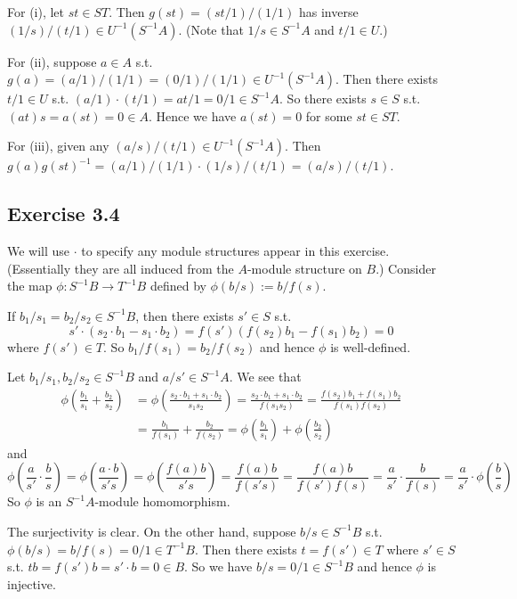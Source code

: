 \documentclass[../A&M.tex]{subfiles}
\begin{document}
For (i), let $st \in ST$. Then $g(st) = (st/1)/(1/1)$ has inverse $(1/s)/(t/1) \in U^{-1}(S^{-1}A)$. (Note that $1/s \in S^{-1}A$ and $t/1 \in U$.)

For (ii), suppose $a\in A$ s.t. $g(a)=(a/1)/(1/1) = (0/1)/(1/1) \in U^{-1}(S^{-1}A)$. Then there exists $t/1 \in U$ s.t. $(a/1) \cdot (t/1) = at/1 = 0/1 \in S^{-1}A$. So there exists $s\in S$ s.t. $(at)s = a(st) = 0 \in A$. Hence we have $a(st)=0$ for some $st \in ST$.

For (iii), given any $(a/s)/(t/1) \in U^{-1}(S^{-1}A)$. Then $g(a)g(st)^{-1} = (a/1)/(1/1) \cdot (1/s)/(t/1) = (a/s)/(t/1)$.

\subsection*{Exercise 3.4}

We will use $\cdot$ to specify any module structures appear in this exercise. (Essentially they are all induced from the $A$-module structure on $B$.) Consider the map $\phi: S^{-1}B \to T^{-1}B$ defined by $\phi(b/s) := b/f(s)$.

If $b_1/s_1 = b_2/s_2 \in S^{-1}B$, then there exists $s' \in S$ s.t.
$$
s' \cdot (s_2\cdot b_1 - s_1 \cdot b_2)
= f(s')(f(s_2)b_1-f(s_1)b_2)
= 0 
$$
where $f(s')\in T$. So $b_1/f(s_1) = b_2/f(s_2)$ and hence $\phi$ is well-defined.

Let $b_1/s_1, b_2/s_2 \in S^{-1}B$ and $a/s' \in S^{-1}A$. We see that
\begin{align*}
\phi \left( \frac{b_1}{s_1} + \frac{b_2}{s_2} \right)
&= \phi \left( \frac{s_2 \cdot b_1 + s_1 \cdot b_2}{s_1s_2} \right)
= \frac{s_2 \cdot b_1 + s_1 \cdot b_2}{f(s_1s_2)}
= \frac{f(s_2)b_1 + f(s_1)b_2}{f(s_1)f(s_2)}     \\
&= \frac{b_1}{f(s_1)} + \frac{b_2}{f(s_2)}
= \phi \left( \frac{b_1}{s_1} \right) + \phi \left( \frac{b_2}{s_2} \right)
\end{align*}
and
$$
\phi \left( \frac{a}{s'} \cdot \frac{b}{s} \right)
= \phi \left( \frac{a \cdot b}{s's} \right)
= \phi \left( \frac{f(a)b}{s's} \right)
= \frac{f(a)b}{f(s's)}
= \frac{f(a)b}{f(s')f(s)}
= \frac{a}{s'} \cdot \frac{b}{f(s)}
= \frac{a}{s'} \cdot \phi \left( \frac{b}{s} \right)
$$
So $\phi$ is an $S^{-1}A$-module homomorphism.

The surjectivity is clear. On the other hand, suppose $b/s \in S^{-1}B$ s.t. $\phi(b/s) = b/f(s) = 0/1 \in T^{-1}B$. Then there exists $t = f(s') \in T$ where $s'\in S$ s.t. $tb = f(s') b = s' \cdot b = 0 \in B$. So we have $b/s = 0/1 \in S^{-1}B$ and hence $\phi$ is injective.
\end{document}
